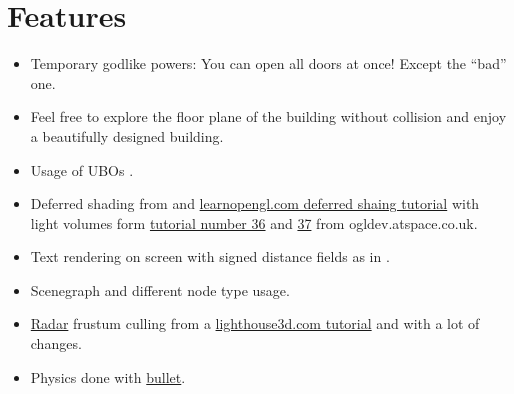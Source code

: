 \documentclass[12pt]{article}
\begin{document}
\section{Features}
\begin{itemize}
	\item Temporary godlike powers: You can open all doors at once! Except the ``bad'' one.
	\item Feel free to explore the floor plane of the building without collision and enjoy a beautifully designed building.
	\item Usage of UBOs \cite{openGLSuperBible}.
	\item Deferred shading from \cite{openGLSuperBible} and \href{http://learnopengl.com/#!Advanced-Lighting/Deferred-Shading}{learnopengl.com deferred shaing tutorial} with light volumes form
	\href{http://ogldev.atspace.co.uk/www/tutorial36/tutorial36.html}{tutorial number 36} and \href{http://ogldev.atspace.co.uk/www/tutorial37/tutorial37.html}{37} from ogldev.atspace.co.uk.
	\item Text rendering on screen with signed distance fields as in \cite{signedDistanceFields}.
	\item Scenegraph and different node type usage.
  \item \href{https://www.youtube.com/watch?v=2LW9JSYn_h0}{Radar} frustum culling from a \href{http://www.lighthouse3d.com/tutorials/view-frustum-culling/radar-approach-implementation-ii}{lighthouse3d.com tutorial} and \cite{gems5} with a lot of changes.
  \item Physics done with \href{http://bulletphysics.org/wordpress/}{bullet}.
\end{itemize}
\end{document}
